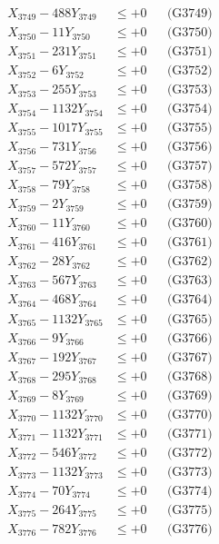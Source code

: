 \documentclass[a4paper,10pt]{article}
\begin{document}
{\begin{align}
X_{3749} - 488Y_{3749} &\leq +0 && \text{(G3749)} \\
X_{3750} - 11Y_{3750} &\leq +0 && \text{(G3750)} \\
\allowbreak
X_{3751} - 231Y_{3751} &\leq +0 && \text{(G3751)} \\
X_{3752} - 6Y_{3752} &\leq +0 && \text{(G3752)} \\
X_{3753} - 255Y_{3753} &\leq +0 && \text{(G3753)} \\
X_{3754} - 1132Y_{3754} &\leq +0 && \text{(G3754)} \\
X_{3755} - 1017Y_{3755} &\leq +0 && \text{(G3755)} \\
X_{3756} - 731Y_{3756} &\leq +0 && \text{(G3756)} \\
X_{3757} - 572Y_{3757} &\leq +0 && \text{(G3757)} \\
X_{3758} - 79Y_{3758} &\leq +0 && \text{(G3758)} \\
X_{3759} - 2Y_{3759} &\leq +0 && \text{(G3759)} \\
X_{3760} - 11Y_{3760} &\leq +0 && \text{(G3760)} \\
\allowbreak
X_{3761} - 416Y_{3761} &\leq +0 && \text{(G3761)} \\
X_{3762} - 28Y_{3762} &\leq +0 && \text{(G3762)} \\
X_{3763} - 567Y_{3763} &\leq +0 && \text{(G3763)} \\
X_{3764} - 468Y_{3764} &\leq +0 && \text{(G3764)} \\
X_{3765} - 1132Y_{3765} &\leq +0 && \text{(G3765)} \\
X_{3766} - 9Y_{3766} &\leq +0 && \text{(G3766)} \\
X_{3767} - 192Y_{3767} &\leq +0 && \text{(G3767)} \\
X_{3768} - 295Y_{3768} &\leq +0 && \text{(G3768)} \\
X_{3769} - 8Y_{3769} &\leq +0 && \text{(G3769)} \\
X_{3770} - 1132Y_{3770} &\leq +0 && \text{(G3770)} \\
\allowbreak
X_{3771} - 1132Y_{3771} &\leq +0 && \text{(G3771)} \\
X_{3772} - 546Y_{3772} &\leq +0 && \text{(G3772)} \\
X_{3773} - 1132Y_{3773} &\leq +0 && \text{(G3773)} \\
X_{3774} - 70Y_{3774} &\leq +0 && \text{(G3774)} \\
X_{3775} - 264Y_{3775} &\leq +0 && \text{(G3775)} \\
X_{3776} - 782Y_{3776} &\leq +0 && \text{(G3776)} \\

\end{align}}
\end{document}
